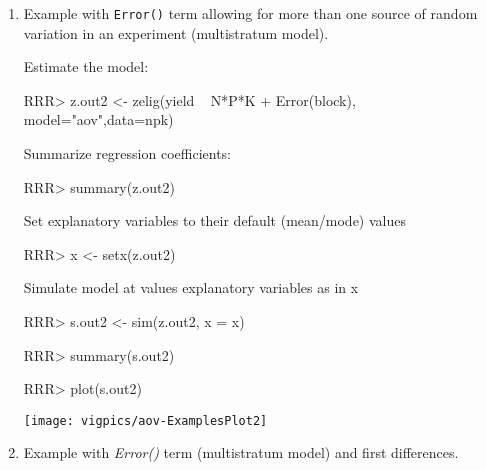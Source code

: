 \begin{enumerate}
\item Example with {\tt Error()} term allowing for more than one
  source of random variation in an experiment (multistratum model). 

Estimate the model:
\begin{Schunk}
\begin{Sinput}
RRR>  z.out2 <- zelig(yield ~  N*P*K + Error(block), model="aov",data=npk)
\end{Sinput}
\end{Schunk}
Summarize regression coefficients:
\begin{Schunk}
\begin{Sinput}
RRR>  summary(z.out2)
\end{Sinput}
\end{Schunk}
Set explanatory variables to their default (mean/mode) values
\begin{Schunk}
\begin{Sinput}
RRR>  x <- setx(z.out2)
\end{Sinput}
\end{Schunk}
Simulate model at values explanatory variables as in x
\begin{Schunk}
\begin{Sinput}
RRR>  s.out2 <- sim(z.out2, x = x)
\end{Sinput}
\end{Schunk}
\begin{Schunk}
\begin{Sinput}
RRR>  summary(s.out2)
\end{Sinput}
\end{Schunk}
\begin{center}
\begin{Schunk}
\begin{Sinput}
RRR>  plot(s.out2)
\end{Sinput}
\end{Schunk}
\texttt{[image: vigpics/aov-ExamplesPlot2]}
\end{center}

\item Example with {\it Error()} term (multistratum model) and first
  differences. 


\end{enumerate}
